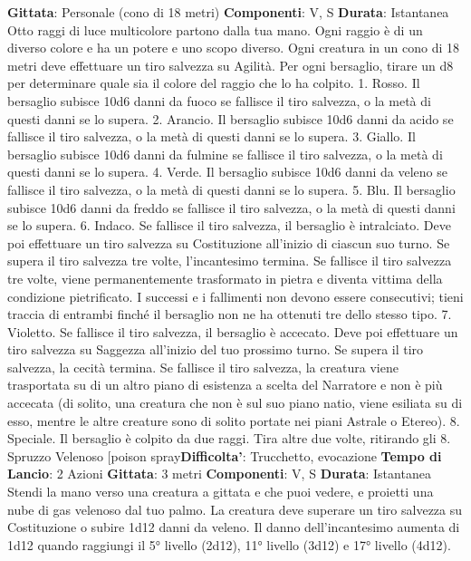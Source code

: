 \begin{multicols}{2}
\textbf{Gittata}: Personale (cono di 18 metri)
\textbf{Componenti}: V, S
\textbf{Durata}: Istantanea
Otto raggi di luce multicolore partono dalla tua mano.
Ogni raggio è di un diverso colore e ha un potere e uno
scopo diverso. Ogni creatura in un cono di 18 metri
deve effettuare un tiro salvezza su Agilità. Per ogni
bersaglio, tirare un d8 per determinare quale sia il
colore del raggio che lo ha colpito.
1. Rosso. Il bersaglio subisce 10d6 danni da fuoco se
fallisce il tiro salvezza, o la metà di questi danni se lo
supera.
2. Arancio. Il bersaglio subisce 10d6 danni da acido se
fallisce il tiro salvezza, o la metà di questi danni se lo
supera.
3. Giallo. Il bersaglio subisce 10d6 danni da fulmine se
fallisce il tiro salvezza, o la metà di questi danni se lo
supera.
4. Verde. Il bersaglio subisce 10d6 danni da veleno se
fallisce il tiro salvezza, o la metà di questi danni se lo
supera.
5. Blu. Il bersaglio subisce 10d6 danni da freddo se
fallisce il tiro salvezza, o la metà di questi danni se lo
supera.
6. Indaco. Se fallisce il tiro salvezza, il bersaglio è
intralciato. Deve poi effettuare un tiro salvezza su
Costituzione all’inizio di ciascun suo turno. Se supera il
tiro salvezza tre volte, l’incantesimo termina. Se fallisce
il tiro salvezza tre volte, viene permanentemente
trasformato in pietra e diventa vittima della condizione
pietrificato. I successi e i fallimenti non devono essere
consecutivi; tieni traccia di entrambi finché il bersaglio
non ne ha ottenuti tre dello stesso tipo.
7. Violetto. Se fallisce il tiro salvezza, il bersaglio è
accecato. Deve poi effettuare un tiro salvezza su
Saggezza all’inizio del tuo prossimo turno. Se supera il
tiro salvezza, la cecità termina. Se fallisce il tiro
salvezza, la creatura viene trasportata su di un altro
piano di esistenza a scelta del Narratore e non è più accecata
(di solito, una creatura che non è sul suo piano natio,
viene esiliata su di esso, mentre le altre creature sono
di solito portate nei piani Astrale o Etereo).
8. Speciale. Il bersaglio è colpito da due raggi. Tira
altre due volte, ritirando gli 8.
Spruzzo Velenoso
[poison spray\textbf{Difficolta'}:
Trucchetto, evocazione
\textbf{Tempo di Lancio}: 2 Azioni
\textbf{Gittata}: 3 metri
\textbf{Componenti}: V, S
\textbf{Durata}: Istantanea
Stendi la mano verso una creatura a gittata e che puoi
vedere, e proietti una nube di gas velenoso dal tuo
palmo. La creatura deve superare un tiro salvezza su
Costituzione o subire 1d12 danni da veleno.
Il danno dell’incantesimo aumenta di 1d12 quando
raggiungi il 5° livello (2d12), 11° livello (3d12) e 17°
livello (4d12).

\end{multicols}
